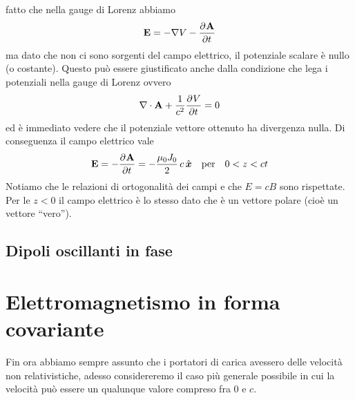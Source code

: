 fatto che nella gauge di Lorenz abbiamo 
\begin{align}
  \mathbf{ E } = - \nabla V - \frac{\partial^{} {\mathbf{ A }}}{\partial {t}^{}}
\end{align}
ma dato che non ci sono sorgenti del campo elettrico, il potenziale scalare è nullo (o costante). Questo può essere giustificato anche dalla condizione 
che lega i potenziali nella gauge di Lorenz ovvero
\begin{align}
  \nabla \cdot \mathbf{ A } + \frac{1}{c^2} \frac{\partial^{} {V}}{\partial {t}^{}} = 0
\end{align}
ed è immediato vedere che il potenziale vettore ottenuto ha divergenza nulla. Di conseguenza il campo elettrico vale
\begin{align}
  \mathbf{ E } = -\frac{\partial^{} {\mathbf{ A }}}{\partial {t}^{}} = -\frac{\mu_0J_0}{2}\, c \,\hat{\boldsymbol{x}} \quad \text{per} \quad 0 < z < ct
\end{align}
Notiamo che le relazioni di ortogonalità dei campi e che $ E = c B $ sono rispettate. Per le $ z < 0  $ il campo elettrico è lo stesso dato che è un 
vettore polare (cioè un vettore \enquote{vero}).

\section{Dipoli oscillanti in fase}

\chapter{Elettromagnetismo in forma covariante}
Fin ora abbiamo sempre assunto che i portatori di carica avessero delle velocità non relativistiche, adesso considereremo il caso più generale possibile 
in cui la velocità può essere un qualunque valore compreso fra $ 0 $ e $ c $.
